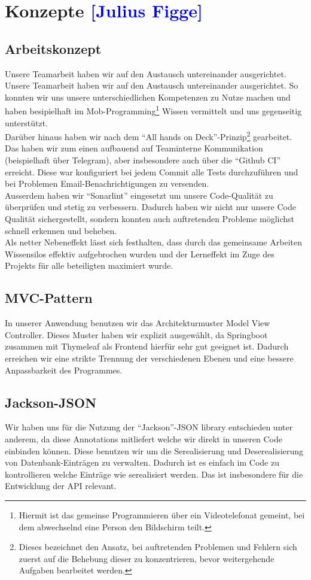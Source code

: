 

\section{Konzepte \textcolor{blue}{[Julius Figge]}}

\subsection{Arbeitskonzept}
\label{Arbeitskonzept}
Unsere Teamarbeit haben wir auf den Austausch untereinander ausgerichtet.
Unsere Teamarbeit haben wir auf den Austausch untereinander ausgerichtet.
So konnten wir uns unsere unterschiedlichen Kompetenzen zu Nutze machen und haben besipielhaft im Mob-Programming\footnote{Hiermit ist das gemeinse Programmieren über ein Videotelefonat gemeint, bei dem abwechselnd eine Person den Bildschirm teilt.} Wissen vermittelt und uns gegenseitig unterstützt.\\
Darüber hinaus haben wir nach dem \enquote{All hands on Deck}-Prinzip\footnote{Dieses bezeichnet den Ansatz, bei auftretenden Problemen und Fehlern sich zuerst auf die Behebung dieser zu konzentrieren, bevor weitergehende Aufgaben bearbeitet werden.} gearbeitet.\\
Das haben wir zum einen aufbauend auf Teaminterne Kommunikation (beispielhaft über Telegram), aber insbesondere auch über die \enquote{Github CI} erreicht.
Diese war konfiguriert bei jedem Commit alle Tests durchzuführen und bei Problemen Email-Benachrichtigungen zu versenden.\\
Ausserdem haben wir \enquote{Sonarlint} eingesetzt um unsere Code-Qualität zu überprüfen und stetig zu verbessern.
Dadurch haben wir nicht nur unsere Code Qualität sichergestellt, sondern konnten auch auftretenden Probleme möglichst schnell erkennen und beheben.\\
Als netter Nebeneffekt lässt sich festhalten, dass durch das gemeinsame Arbeiten Wissensilos effektiv aufgebrochen wurden und der Lerneffekt im Zuge des Projekts für alle beteiligten maximiert wurde.

\subsection{MVC-Pattern}
In unserer Anwendung benutzen wir das Architekturmuster Model View Controller.
Dieses Muster haben wir explizit ausgewählt, da Springboot zusammen mit Thymeleaf als Frontend hierfür sehr gut geeignet ist. Dadurch erreichen wir eine strikte Trennung der verschiedenen Ebenen und eine bessere Anpassbarkeit des Programmes.

\subsection{Jackson-JSON}
Wir haben uns für die Nutzung der \enquote{Jackson}-JSON library entschieden unter anderem, da diese Annotations mitliefert welche wir direkt in unseren Code einbinden können. Diese benutzen wir um die Serealisierung und Deserealisierung von Datenbank-Einträgen zu verwalten. Dadurch ist es einfach im Code zu kontrollieren welche Einträge wie serealisiert werden. Das ist insbesondere für die Entwicklung der API relevant.